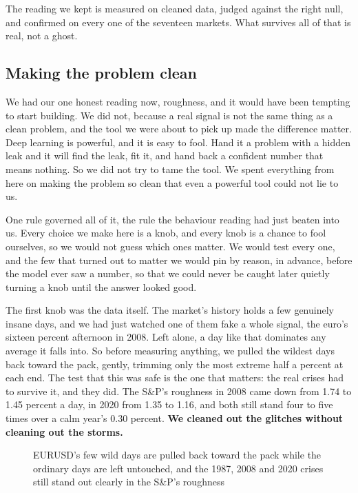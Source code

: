 \documentclass[11pt]{article} %
\begin{document}
The reading we kept is measured on cleaned data, judged against the right null, and confirmed on every one of the seventeen markets. What survives all of that is real, not a ghost.


\subsection{Making the problem clean}


We had our one honest reading now, roughness, and it would have been tempting to start building. We did not, because a real signal is not the same thing as a clean problem, and the tool we were about to pick up made the difference matter. Deep learning is powerful, and it is easy to fool. Hand it a problem with a hidden leak and it will find the leak, fit it, and hand back a confident number that means nothing. So we did not try to tame the tool. We spent everything from here on making the problem so clean that even a powerful tool could not lie to us.

One rule governed all of it, the rule the behaviour reading had just beaten into us. Every choice we make here is a knob, and every knob is a chance to fool ourselves, so we would not guess which ones matter. We would test every one, and the few that turned out to matter we would pin by reason, in advance, before the model ever saw a number, so that we could never be caught later quietly turning a knob until the answer looked good.

The first knob was the data itself. The market's history holds a few genuinely insane days, and we had just watched one of them fake a whole signal, the euro's sixteen percent afternoon in 2008. Left alone, a day like that dominates any average it falls into. So before measuring anything, we pulled the wildest days back toward the pack, gently, trimming only the most extreme half a percent at each end. The test that this was safe is the one that matters: the real crises had to survive it, and they did. The S\&P's roughness in 2008 came down from 1.74 to 1.45 percent a day, in 2020 from 1.35 to 1.16, and both still stand four to five times over a calm year's 0.30 percent. \textbf{We cleaned out the glitches without cleaning out the storms.}

\begin{figure}[htbp]
\centering

\caption{EURUSD's few wild days are pulled back toward the pack while the ordinary days are left untouched, and the 1987, 2008 and 2020 crises still stand out clearly in the S\&P's roughness}
\end{figure}
\end{document}
